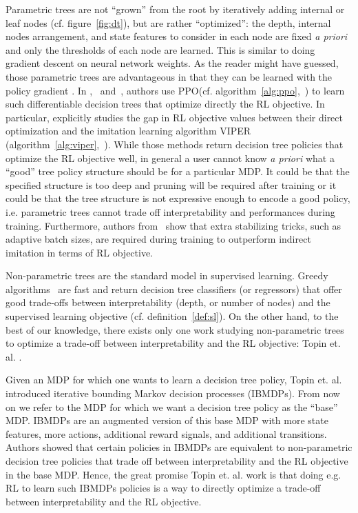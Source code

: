 Parametric trees are not ``grown'' from the root by iteratively adding internal or leaf nodes (cf. figure~\ref{fig:dt}), but are rather ``optimized'': the depth, internal nodes arrangement, and state features to consider in each node are fixed \textit{a priori} and only the thresholds of each node are learned.
This is similar to doing gradient descent on neural network weights.
As the reader might have guessed, those parametric trees are advantageous in that they can be learned with the policy gradient \cite{pg_sutton}.
In \cite{silva},~\cite{vos2024optimizinginterpretabledecisiontree} and~\cite{sympol}, authors use PPO(cf. algorithm~\ref{alg:ppo},~\cite{ppo}) to learn such differentiable decision trees that optimize directly the RL objective.
In particular, \cite{sympol} explicitly studies the gap in RL objective values between their direct optimization and the imitation learning algorithm VIPER (algorithm~\ref{alg:viper},~\cite{viper}).
While those methods return decision tree policies that optimize the RL objective well, in general a user cannot know \textit{a priori}  what a ``good'' tree policy structure should be for a particular MDP.
It could be that the specified structure is too deep and pruning will be required after training or it could be that the tree structure is not expressive enough to encode a good policy, i.e. parametric trees cannot trade off interpretability and performances during training.
Furthermore, authors from~\cite{sympol} show that extra stabilizing tricks, such as adaptive batch sizes, are required during training to outperform indirect imitation in terms of RL objective.

Non-parametric trees are the standard model in supervised learning. Greedy algorithms~\cite{breiman1984classification,ID3,c45} are fast and return decision tree classifiers (or regressors) that offer good trade-offs between interpretability (depth, or number of nodes) and the supervised learning objective (cf. definition~\ref{def:sl}).
On the other hand, to the best of our knowledge, there exists only one work studying non-parametric trees to optimize a trade-off between interpretability and the RL objective: Topin et. al. \cite{topin2021iterative}.

Given an MDP for which one wants to learn a decision tree policy, Topin et. al. introduced iterative bounding Markov decision processes (IBMDPs).
From now on we refer to the MDP for which we want a decision tree policy as the ``base'' MDP.
IBMDPs are an augmented version of this base MDP with more state features, more actions, additional reward signals, and additional transitions.
Authors showed that certain policies in IBMDPs are equivalent to non-parametric decision tree policies that trade off between interpretability and the RL objective in the base MDP.
Hence, the great promise Topin et. al. work is that doing e.g. RL to learn such IBMDPs policies is a way to directly optimize a trade-off between interpretability and the RL objective.

